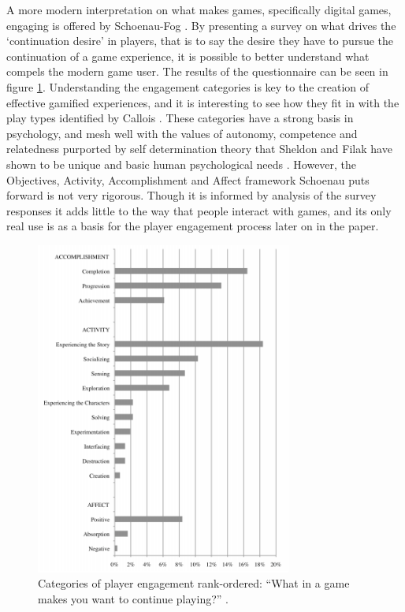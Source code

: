 \documentclass[12pt]{article}
\begin{document}
A more modern interpretation on what makes games, specifically digital games, engaging is offered by Schoenau-Fog \cite{schoenau2011player}. By presenting a survey on what drives the `continuation desire' in players, that is to say the desire they have to pursue the continuation of a game experience, it is possible to better understand what compels the modern game user. The results of the questionnaire can be seen in figure \ref{fog}. Understanding the engagement categories is key to the creation of effective gamified experiences, and it is interesting to see how they fit in with the play types identified by Callois \cite{caillois1961man}. These categories have a strong basis in psychology, and mesh well with the values of autonomy, competence and relatedness purported by self determination theory that Sheldon and Filak have shown to be unique and basic human psychological needs \cite{sheldon2008manipulating}. However, the Objectives, Activity, Accomplishment and Affect framework Schoenau puts forward is not very rigorous. Though it is informed by analysis of the survey responses it adds little to the way that people interact with games, and its only real use is as a basis for the player engagement process later on in the paper.

\begin{figure}[p]
	\includegraphics[width=0.75\textwidth]{../img/fog.png}
	\caption{Categories of player engagement rank-ordered: ``What in a game makes you want to continue playing?'' \cite{schoenau2011player}.}
	\label{fog}
\end{figure}
\end{document}
